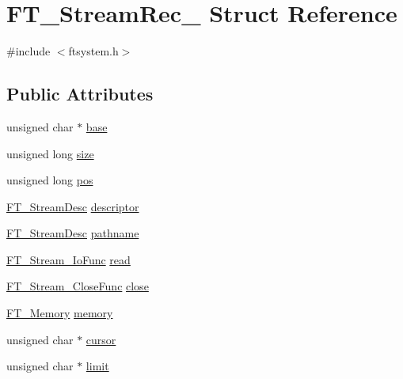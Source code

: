 \hypertarget{struct_f_t___stream_rec__}{}\section{F\+T\+\_\+\+Stream\+Rec\+\_\+ Struct Reference}
\label{struct_f_t___stream_rec__}


{\ttfamily \#include $<$ftsystem.\+h$>$}

\subsection*{Public Attributes}
\begin{DoxyCompactItemize}
\item 
unsigned char $\ast$ \mbox{\hyperlink{struct_f_t___stream_rec___a7b406cb9a60c5a8b4bd8d04b7a23cfee}{base}}
\item 
unsigned long \mbox{\hyperlink{struct_f_t___stream_rec___ab00e3cf802c950d0ca5a022a06953123}{size}}
\item 
unsigned long \mbox{\hyperlink{struct_f_t___stream_rec___a5bf82c2ff4554752edfeec442fba2f33}{pos}}
\item 
\mbox{\hyperlink{ftsystem_8h_ad7ddff377e42bfb38bec17f11fa75911}{F\+T\+\_\+\+Stream\+Desc}} \mbox{\hyperlink{struct_f_t___stream_rec___a361c44020eace21cc453b51852d8cc4f}{descriptor}}
\item 
\mbox{\hyperlink{ftsystem_8h_ad7ddff377e42bfb38bec17f11fa75911}{F\+T\+\_\+\+Stream\+Desc}} \mbox{\hyperlink{struct_f_t___stream_rec___afd75c5de5ed78c484a200a7e97ef5a41}{pathname}}
\item 
\mbox{\hyperlink{ftsystem_8h_a1909d9c00ba62592c047a9868e5a6b0b}{F\+T\+\_\+\+Stream\+\_\+\+Io\+Func}} \mbox{\hyperlink{struct_f_t___stream_rec___af724049d0258d4988c2b11c3a08b1b05}{read}}
\item 
\mbox{\hyperlink{ftsystem_8h_a9ab6151513724c69e5493d520d43135f}{F\+T\+\_\+\+Stream\+\_\+\+Close\+Func}} \mbox{\hyperlink{struct_f_t___stream_rec___a7d7c7a1d7de8f580d7ad66efe89defa9}{close}}
\item 
\mbox{\hyperlink{ftsystem_8h_a67ec7ea35cde99a89a65e9f827a9ad3a}{F\+T\+\_\+\+Memory}} \mbox{\hyperlink{struct_f_t___stream_rec___a51e2be0d80d70b532aae3face5461e7e}{memory}}
\item 
unsigned char $\ast$ \mbox{\hyperlink{struct_f_t___stream_rec___ab7dbbad87d8b6d0178771a06e1ce8b4d}{cursor}}
\item 
unsigned char $\ast$ \mbox{\hyperlink{struct_f_t___stream_rec___aff006e6ee3bbc2741a2c4ae79b1bad3a}{limit}}
\end{DoxyCompactItemize}


